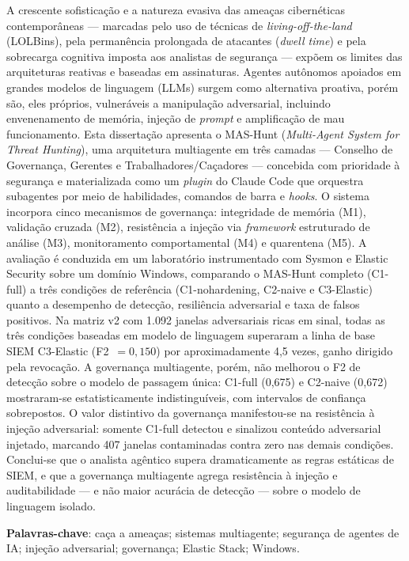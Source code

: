 \documentclass[
  12pt,
  a4paper,
  oneside,        %
  brazil
]{abntex2}
\begin{document}
\begin{resumo}
A crescente sofisticação e a natureza evasiva das ameaças cibernéticas
contemporâneas — marcadas pelo uso de técnicas de \emph{living-off-the-land}
(LOLBins), pela permanência prolongada de atacantes (\emph{dwell time}) e pela
sobrecarga cognitiva imposta aos analistas de segurança — expõem os limites das
arquiteturas reativas e baseadas em assinaturas. Agentes autônomos apoiados em
grandes modelos de linguagem (LLMs) surgem como alternativa proativa, porém são,
eles próprios, vulneráveis a manipulação adversarial, incluindo envenenamento de
memória, injeção de \emph{prompt} e amplificação de mau funcionamento. Esta
dissertação apresenta o MAS-Hunt (\emph{Multi-Agent System for Threat Hunting}),
uma arquitetura multiagente em três camadas — Conselho de Governança, Gerentes e
Trabalhadores/Caçadores — concebida com prioridade à segurança e materializada
como um \emph{plugin} do Claude Code que orquestra subagentes por meio de
habilidades, comandos de barra e \emph{hooks}. O sistema incorpora cinco
mecanismos de governança: integridade de memória (M1), validação cruzada (M2),
resistência a injeção via \emph{framework} estruturado de análise (M3),
monitoramento comportamental (M4) e quarentena (M5). A avaliação é conduzida em
um laboratório instrumentado com Sysmon e Elastic Security sobre um domínio
Windows, comparando o MAS-Hunt completo (C1-full) a três condições de referência
(C1-nohardening, C2-naive e C3-Elastic) quanto a desempenho de detecção,
resiliência adversarial e taxa de falsos positivos. Na matriz v2 com 1.092
janelas adversariais ricas em sinal, todas as três condições baseadas em modelo
de linguagem superaram a linha de base SIEM C3-Elastic (F2~$=0{,}150$) por
aproximadamente 4,5 vezes, ganho dirigido pela revocação. A governança
multiagente, porém, não melhorou o F2 de detecção sobre o modelo de passagem
única: C1-full (0,675) e C2-naive (0,672) mostraram-se estatisticamente
indistinguíveis, com intervalos de confiança sobrepostos. O valor distintivo da
governança manifestou-se na resistência à injeção adversarial: somente C1-full
detectou e sinalizou conteúdo adversarial injetado, marcando 407 janelas
contaminadas contra zero nas demais condições. Conclui-se que o analista agêntico
supera dramaticamente as regras estáticas de SIEM, e que a governança multiagente
agrega resistência à injeção e auditabilidade --- e não maior acurácia de
detecção --- sobre o modelo de linguagem isolado.

\noindent\textbf{Palavras-chave}: caça a ameaças; sistemas multiagente; segurança
de agentes de IA; injeção adversarial; governança; Elastic Stack; Windows.
\end{resumo}
\end{document}
